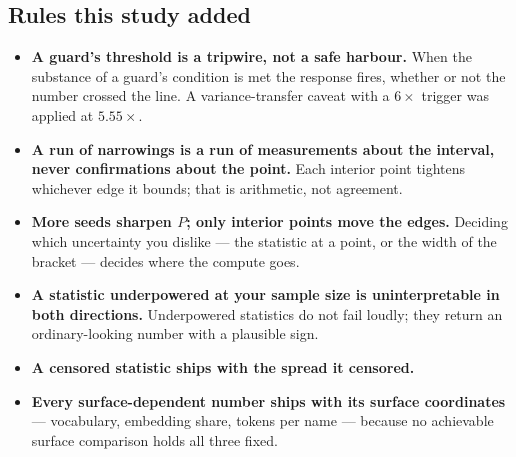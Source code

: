 \subsection*{Rules this study added}

\begin{itemize}
\item \textbf{A guard's threshold is a tripwire, not a safe harbour.} When the substance of a guard's
condition is met the response fires, whether or not the number crossed the line. A variance-transfer
caveat with a $6\times$ trigger was applied at $5.55\times$.
\item \textbf{A run of narrowings is a run of measurements about the interval, never confirmations
about the point.} Each interior point tightens whichever edge it bounds; that is arithmetic, not
agreement.
\item \textbf{More seeds sharpen $P$; only interior points move the edges.} Deciding which
uncertainty you dislike --- the statistic at a point, or the width of the bracket --- decides where
the compute goes.
\item \textbf{A statistic underpowered at your sample size is uninterpretable in both directions.}
Underpowered statistics do not fail loudly; they return an ordinary-looking number with a plausible
sign.
\item \textbf{A censored statistic ships with the spread it censored.}
\item \textbf{Every surface-dependent number ships with its surface coordinates} --- vocabulary,
embedding share, tokens per name --- because no achievable surface comparison holds all three fixed.
\end{itemize}
